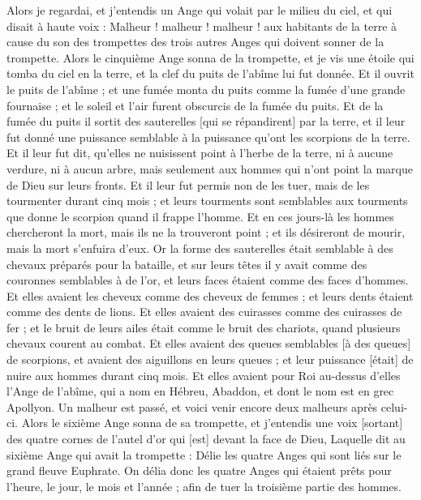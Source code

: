 \begin{multicols}{2}
Alors je regardai, et j'entendis un Ange qui volait par le milieu du ciel, et qui disait à haute voix : Malheur ! malheur ! malheur ! aux habitants de la terre à cause du son des trompettes des trois autres Anges qui doivent sonner de la trompette.
\VerseOne{}Alors le cinquième Ange sonna de la trompette, et je vis une étoile qui tomba du ciel en la terre, et la clef du puits de l'abîme lui fut donnée.
Et il ouvrit le puits de l'abîme ; et une fumée monta du puits comme la fumée d'une grande fournaise ; et le soleil et l'air furent obscurcis de la fumée du puits.
Et de la fumée du puits il sortit des sauterelles [qui se répandirent] par la terre, et il leur fut donné une puissance semblable à la puissance qu'ont les scorpions de la terre.
Et il leur fut dit, qu'elles ne nuisissent point à l'herbe de la terre, ni à aucune verdure, ni à aucun arbre, mais seulement aux hommes qui n'ont point la marque de Dieu sur leurs fronts.
Et il leur fut permis non de les tuer, mais de les tourmenter durant cinq mois ; et leurs tourments sont semblables aux tourments que donne le scorpion quand il frappe l'homme.
Et en ces jours-là les hommes chercheront la mort, mais ils ne la trouveront point ; et ils désireront de mourir, mais la mort s'enfuira d'eux.
Or la forme des sauterelles était semblable à des chevaux préparés pour la bataille, et sur leurs têtes il y avait comme des couronnes semblables à de l'or, et leurs faces étaient comme des faces d'hommes.
Et elles avaient les cheveux comme des cheveux de femmes ; et leurs dents étaient comme des dents de lions.
Et elles avaient des cuirasses comme des cuirasses de fer ; et le bruit de leurs ailes était comme le bruit des chariots, quand plusieurs chevaux courent au combat.
Et elles avaient des queues semblables [à des queues] de scorpions, et avaient des aiguillons en leurs queues ; et leur puissance [était] de nuire aux hommes durant cinq mois.
Et elles avaient pour Roi au-dessus d'elles l'Ange de l'abîme, qui a nom en Hébreu, Abaddon, et dont le nom est en grec Apollyon.
Un malheur est passé, et voici venir encore deux malheurs après celui-ci.
Alors le sixième Ange sonna de sa trompette, et j'entendis une voix [sortant] des quatre cornes de l'autel d'or qui [est] devant la face de Dieu,
Laquelle dit au sixième Ange qui avait la trompette : Délie les quatre Anges qui sont liés sur le grand fleuve Euphrate.
On délia donc les quatre Anges qui étaient prêts pour l'heure, le jour, le mois et l'année ; afin de tuer la troisième partie des hommes.

\end{multicols}
